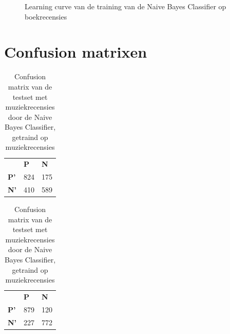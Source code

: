 \begin{figure}[h!]
    \centering
    \label{fig:lc-boek-boek}
    \caption{Learning curve van de training van de Naive Bayes Classifier op boekrecensies}
\end{figure}

\section{Confusion matrixen}

\begin{table}[h]
\centering
\setlength\tabcolsep{4pt}
\begin{minipage}[t]{0.48\textwidth}
\centering
\begin{tabular}{lll}
                                 & \textbf{P}               & \textbf{N}               \\ \cline{2-3} 
\multicolumn{1}{l|}{\textbf{P'}} & \multicolumn{1}{l|}{824} & \multicolumn{1}{l|}{175} \\ \cline{2-3} 
\multicolumn{1}{l|}{\textbf{N'}} & \multicolumn{1}{l|}{410} & \multicolumn{1}{l|}{589} \\ \cline{2-3} 
\end{tabular}
\caption{Confusion matrix van de testset met filmrecensies door de  Naive Bayes Classifier, getraind op filmrecensies} 
\end{minipage}%
\hfill
\begin{minipage}[t]{0.48\textwidth}
\centering
\begin{tabular}{lll}
                                 & \textbf{P}               & \textbf{N}               \\ \cline{2-3} 
\multicolumn{1}{l|}{\textbf{P'}} & \multicolumn{1}{l|}{879} & \multicolumn{1}{l|}{120} \\ \cline{2-3} 
\multicolumn{1}{l|}{\textbf{N'}} & \multicolumn{1}{l|}{227} & \multicolumn{1}{l|}{772} \\ \cline{2-3} 
\end{tabular}
\caption{Confusion matrix van de testset met muziekrecensies door de  Naive Bayes Classifier, getraind op muziekrecensies} 
\end{minipage}
\end{table}

